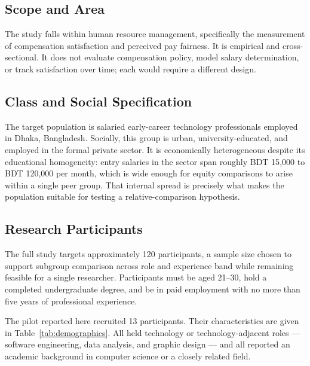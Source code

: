 \documentclass[conference]{IEEEtran}
\begin{document}
\subsection{Scope and Area}

The study falls within human resource management, specifically the
measurement of compensation satisfaction and perceived pay fairness. It
is empirical and cross-sectional. It does not evaluate compensation
policy, model salary determination, or track satisfaction over time; each
would require a different design.

\subsection{Class and Social Specification}

The target population is salaried early-career technology professionals
employed in Dhaka, Bangladesh. Socially, this group is urban,
university-educated, and employed in the formal private sector. It is
economically heterogeneous despite its educational homogeneity: entry
salaries in the sector span roughly BDT 15{,}000 to BDT 120{,}000 per
month, which is wide enough for equity comparisons to arise within a
single peer group. That internal spread is precisely what makes the
population suitable for testing a relative-comparison hypothesis.

\subsection{Research Participants}

The full study targets approximately 120 participants, a sample size
chosen to support subgroup comparison across role and experience band
while remaining feasible for a single researcher. Participants must be
aged 21--30, hold a completed undergraduate degree, and be in paid
employment with no more than five years of professional experience.

The pilot reported here recruited 13 participants. Their characteristics
are given in Table~\ref{tab:demographics}. All held technology or
technology-adjacent roles --- software engineering, data analysis, and
graphic design --- and all reported an academic background in computer
science or a closely related field.
\end{document}
